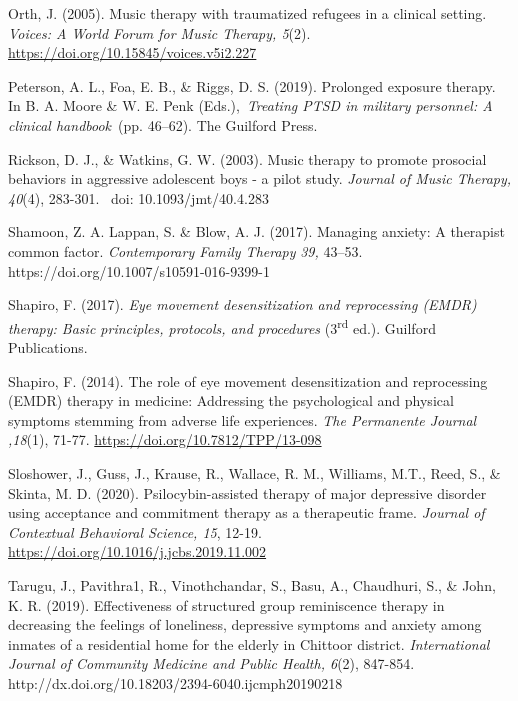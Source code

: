 \documentclass[authordate, empirical, issue]{jote-new-article}
\begin{document}
Orth, J. (2005). Music therapy with traumatized refugees in a clinical setting. \emph{Voices: A World Forum for Music Therapy, 5}(2). \href{https://doi.org/10.15845/voices.v5i2.227}{https://doi.org/10.15845/voices.v5i2.227}



Peterson, A. L., Foa, E. B., \& Riggs, D. S. (2019). Prolonged exposure therapy. In B. A. Moore \& W. E. Penk (Eds.), \emph{Treating PTSD in military personnel: A clinical handbook} (pp. 46--62). The Guilford Press.



Rickson, D. J., \& Watkins, G. W. (2003). Music therapy to promote prosocial behaviors in aggressive adolescent boys - a pilot study. \emph{Journal of Music Therapy, 40}(4), 283-301.  doi: 10.1093/jmt/40.4.283



Shamoon, Z. A. Lappan, S. \& Blow, A. J. (2017). Managing anxiety: A therapist common factor. \emph{Contemporary Family Therapy}\emph{ 39, }43--53.  https://doi.org/10.1007/s10591-016-9399-1



Shapiro, F. (2017). \emph{Eye movement desensitization and reprocessing (EMDR) therapy: Basic principles, protocols, and procedures} (3\textsuperscript{rd} ed.). Guilford Publications.



Shapiro, F. (2014). The role of eye movement desensitization and reprocessing (EMDR) therapy in medicine: Addressing the psychological and physical symptoms stemming from adverse life experiences. \emph{The Permanente Journal ,18}(1), 71-77. \href{https://doi.org/10.7812/TPP/13-098}{https://doi.org/10.7812/TPP/13-098}



Sloshower, J., Guss, J., Krause, R., Wallace, R. M., Williams, M.T., Reed, S., \& Skinta, M. D. (2020). Psilocybin-assisted therapy of major depressive disorder using acceptance and commitment therapy as a therapeutic frame. \emph{Journal of Contextual Behavioral Science}\emph{, 15}, 12-19. \href{https://doi.org/10.1016/j.jcbs.2019.11.002}{https://doi.org/10.1016/j.jcbs.2019.11.002}



Tarugu, J., Pavithra1, R., Vinothchandar, S., Basu, A., Chaudhuri, S., \& John, K. R. (2019). Effectiveness of structured group reminiscence therapy in decreasing the feelings of loneliness, depressive symptoms and anxiety among inmates of a residential home for the elderly in Chittoor district. \emph{International Journal of Community Medicine and Public Health, 6}(2), 847-854. http://dx.doi.org/10.18203/2394-6040.ijcmph20190218
\end{document}
